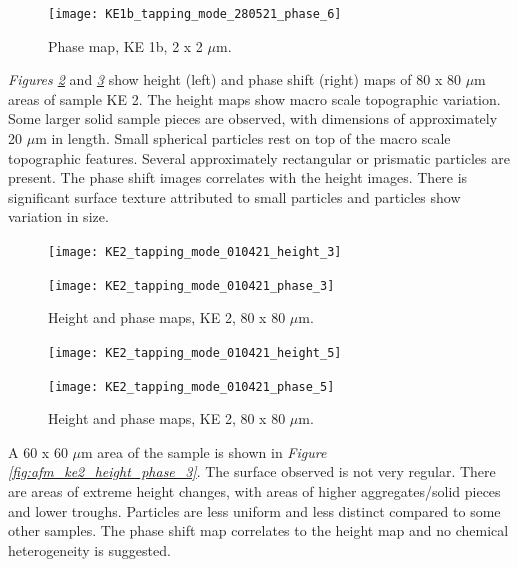 \begin{figure}[H]
\centering
  \texttt{[image: KE1b\_tapping\_mode\_280521\_phase\_6]}
\caption[Phase map, KE 1b]{Phase map, KE 1b, 2 x 2 $\mu$m.}
\label{fig:afm_ke1b_phase_6}
\end{figure}



\textit{Figures \ref{fig:afm_ke2_height_phase_1}} and \textit{\ref{fig:afm_ke2_height_phase_2}} show height (left) and phase shift (right) maps of 80 x 80 $\mu$m areas of sample KE 2. The height maps show macro scale topographic variation. Some larger solid sample pieces are observed, with dimensions of approximately 20 $\mu$m in length. Small spherical particles rest on top of the macro scale topographic features. Several approximately rectangular or prismatic particles are present. The phase shift images correlates with the height images. There is significant surface texture attributed to small particles and particles show variation in size.

\begin{figure}[H]
\centering
\begin{minipage}{.45\textwidth}
  \centering
  \texttt{[image: KE2\_tapping\_mode\_010421\_height\_3]}
\end{minipage}
\begin{minipage}{.45\textwidth}
  \centering
  \texttt{[image: KE2\_tapping\_mode\_010421\_phase\_3]}
\end{minipage}
\caption[Height and phase maps, KE 2]{Height and phase maps, KE 2, 80 x 80 $\mu$m.}
\label{fig:afm_ke2_height_phase_1}
\end{figure}


\begin{figure}[H]
\centering
\begin{minipage}{.45\textwidth}
  \centering
  \texttt{[image: KE2\_tapping\_mode\_010421\_height\_5]}
\end{minipage}
\begin{minipage}{.45\textwidth}
  \centering
  \texttt{[image: KE2\_tapping\_mode\_010421\_phase\_5]}
\end{minipage}
\caption[Height and phase maps, KE 2]{Height and phase maps, KE 2, 80 x 80 $\mu$m.}
\label{fig:afm_ke2_height_phase_2}
\end{figure}

A 60 x 60 $\mu$m area of the sample is shown in \textit{Figure \ref{fig:afm_ke2_height_phase_3}}. The surface observed is not very regular. There are areas of extreme height changes, with areas of higher aggregates/solid pieces and lower troughs. Particles are less uniform and less distinct compared to some other samples. The phase shift map correlates to the height map and no chemical heterogeneity is suggested. 

